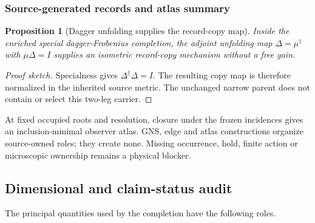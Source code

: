 \documentclass[11pt]{article}
\newtheorem{proposition}{Proposition}
\begin{document}
\subsubsection{Source-generated records and atlas summary}

\begin{proposition}[Dagger unfolding supplies the record-copy map]
\label{prop:dagger-record-unfolding}
Inside the enriched special dagger-Frobenius completion, the adjoint
unfolding map \(\Delta=\mu^\dagger\) with \(\mu\Delta=I\) supplies an
isometric record-copy mechanism without a free gain.
\end{proposition}
\begin{proof}[Proof sketch]
Specialness gives \(\Delta^\dagger\Delta=I\).  The resulting copy map is
therefore normalized in the inherited source metric.  The unchanged narrow
parent does not contain or select this two-leg carrier.
\end{proof}

At fixed occupied roots and resolution, closure under the frozen incidences
gives an inclusion-minimal observer atlas.  GNS, edge and atlas constructions
organize source-owned roles; they create none.  Missing occurrence, hold,
finite action or microscopic ownership remains a physical blocker.

\subsection{Dimensional and claim-status audit}

The principal quantities used by the completion have the following roles.
\end{document}

